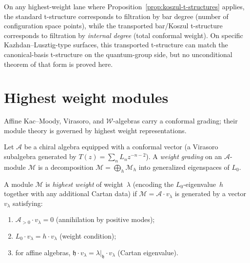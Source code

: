 \begin{remark}
\label{rem:t-structure-geometry}
On any highest-weight lane where Proposition~\ref{prop:koszul-t-structures}
applies, the standard t-structure corresponds to filtration by bar
degree (number of configuration space points), while the transported
bar/Koszul t-structure corresponds to filtration by \emph{internal
degree} (total conformal weight). On specific Kazhdan--Lusztig-type
surfaces, this transported t-structure can match the canonical-basis
t-structure on the quantum-group side, but no unconditional theorem of
that form is proved here.
\end{remark}

\section{Highest weight modules}\label{sec:highest-weight-modules}

Affine Kac--Moody, Virasoro, and $\mathcal{W}$-algebras carry
a conformal grading; their module theory is governed by highest
weight representations.

\begin{definition}
\label{def:highest-weight-module}
Let $\mathcal{A}$ be a chiral algebra equipped with a conformal vector
(a Virasoro subalgebra generated by $T(z) = \sum_{n} L_n z^{-n-2}$).
A \emph{weight grading} on an $\mathcal{A}$-module $\mathcal{M}$ is a
decomposition $\mathcal{M} = \bigoplus_{h} \mathcal{M}_h$ into
generalized eigenspaces of $L_0$.

A module $\mathcal{M}$ is \emph{highest weight} of weight~$\lambda$
(encoding the $L_0$-eigenvalue~$h$ together with any additional Cartan
data) if $\mathcal{M} = \mathcal{A} \cdot v_\lambda$ is generated by a
vector $v_\lambda$ satisfying:
\begin{enumerate}[label=(\roman*)]
\item $\mathcal{A}_{>0} \cdot v_\lambda = 0$ (annihilation by
 positive modes);
\item $L_0 \cdot v_\lambda = h \cdot v_\lambda$ (weight condition);
\item for affine algebras, $\mathfrak{h} \cdot v_\lambda = \lambda|_\mathfrak{h} \cdot v_\lambda$
 (Cartan eigenvalue).
\end{enumerate}
\end{definition}

